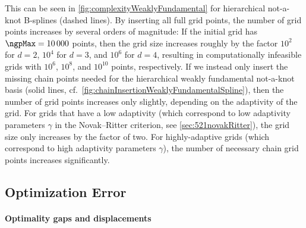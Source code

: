 This can be seen in \cref{fig:complexityWeaklyFundamental}
for hierarchical not-a-knot B-splines (dashed lines).
By inserting all full grid points,
the number of grid points increases by several orders of magnitude:
If the initial grid has $\ngpMax = \num{10000}$ points,
then the grid size increases roughly by the factor $10^2$ for $d = 2$,
$10^4$ for $d = 3$, and $10^6$ for $d = 4$,
resulting in computationally infeasible
grids with $10^6$, $10^8$, and $10^{10}$ points, respectively.
If we instead only insert the missing chain points needed for the
hierarchical weakly fundamental not-a-knot basis
(solid lines, cf.\ \cref{fig:chainInsertionWeaklyFundamentalSpline}),
then the number of grid points increases only slightly,
depending on the adaptivity of the grid.
For grids that have a low adaptivity (which correspond
to low adaptivity parameters $\gamma$ in the Novak--Ritter criterion,
see \cref{sec:521novakRitter}), the grid size only increases by the
factor of two.
For highly-adaptive grids
(which correspond to high adaptivity parameters $\gamma$),
the number of necessary chain grid points increases significantly.



\subsection{Optimization Error}
\label{sec:542optimization}

\paragraph{Optimality gaps and displacements}

